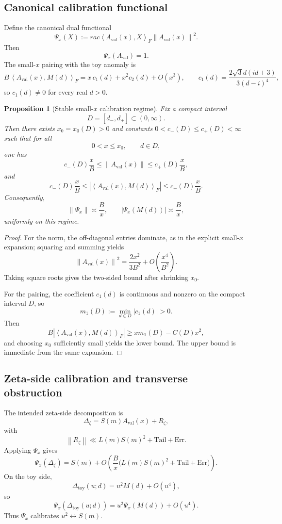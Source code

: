 \documentclass[11pt]{article}
\theoremstyle{plain}
\newtheorem{proposition}[theorem]{Proposition}
\theoremstyle{definition}
\newcommand{\Psical}{\Psi}
\newcommand{\toy}{\mathrm{toy}}
\newcommand{\val}{\mathrm{val}}
\newcommand{\Err}{\mathrm{Err}}
\newcommand{\Tail}{\mathrm{Tail}}
\newcommand{\Aval}{A_{\val}}
\newcommand{\inner}[2]{\left\langle #1,#2\right\rangle_F}
\newcommand{\norm}[1]{\left\lVert #1\right\rVert}
\newcommand{\abs}[1]{\left\lvert #1\right\rvert}
\begin{document}
\subsection{Canonical calibration functional}

Define the canonical dual functional
\[
\Psical_x(X):=rac{\inner{\Aval(x)}{X}}{\norm{\Aval(x)}^2}.
\]
Then
\[
\Psical_x(\Aval)=1.
\]
The small-$x$ pairing with the toy anomaly is
\[
B\,\inner{\Aval(x)}{M(d)}
=
x\,c_1(d)+x^2c_2(d)+O(x^3),
\qquad
c_1(d)=\frac{2\sqrt3 d(id+3)}{3(d-i)^4},
\]
so $c_1(d)\neq 0$ for every real $d>0$.

\begin{proposition}[Stable small-$x$ calibration regime]
Fix a compact interval
\[
D=[d_-,d_+]\subset(0,\infty).
\]
Then there exists $x_0=x_0(D)>0$ and constants $0<c_-(D)\le c_+(D)<\infty$ such that for all
\[
0<x\le x_0,
\qquad
d\in D,
\]
one has
\[
c_-(D)\frac{x}{B}\le \norm{\Aval(x)}\le c_+(D)\frac{x}{B},
\]
and
\[
c_-(D)\frac{x}{B}\le \abs{\inner{\Aval(x)}{M(d)}}\le c_+(D)\frac{x}{B}.
\]
Consequently,
\[
\norm{\Psical_x}\asymp \frac{B}{x},
\qquad
\abs{\Psical_x(M(d))}\asymp \frac{B}{x},
\]
uniformly on this regime.
\end{proposition}

\begin{proof}
For the norm, the off-diagonal entries dominate, as in the explicit small-$x$ expansion; squaring and summing yields
\[
\norm{\Aval(x)}^2=\frac{2x^2}{3B^2}+O\!\left(\frac{x^4}{B^2}\right).
\]
Taking square roots gives the two-sided bound after shrinking $x_0$.

For the pairing, the coefficient $c_1(d)$ is continuous and nonzero on the compact interval $D$, so
\[
m_1(D):=\min_{d\in D}\abs{c_1(d)}>0.
\]
Then
\[
B\abs{\inner{\Aval(x)}{M(d)}}\ge x m_1(D)-C(D)x^2,
\]
and choosing $x_0$ sufficiently small yields the lower bound. The upper bound is immediate from the same expansion.
\end{proof}

\subsection{Zeta-side calibration and transverse obstruction}

The intended zeta-side decomposition is
\[
\Delta_\zeta = S(m)\Aval(x)+R_\zeta,
\]
with
\[
\norm{R_\zeta}\ll L(m)S(m)^2+\Tail+\Err.
\]
Applying $\Psical_x$ gives
\[
\Psical_x(\Delta_\zeta)
=
S(m)+O\!\left(\frac{B}{x}\bigl(L(m)S(m)^2+\Tail+\Err\bigr)\right).
\]
On the toy side,
\[
\Delta_\toy(u;d)=u^2M(d)+O(u^4),
\]
so
\[
\Psical_x(\Delta_\toy(u;d))
=
u^2\Psical_x(M(d))+O(u^4).
\]
Thus $\Psical_x$ calibrates $u^2\leftrightarrow S(m)$.
\end{document}
